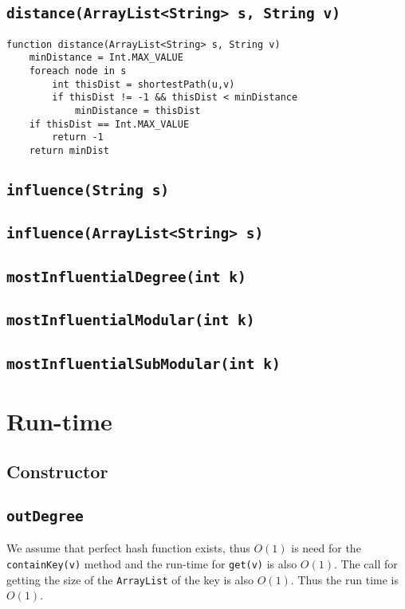 \documentclass[10pt,letterpaper]{article}
\begin{document}
\subsection{\texttt{distance(ArrayList<String> s, String v)}}
\begin{verbatim}
function distance(ArrayList<String> s, String v) 
    minDistance = Int.MAX_VALUE
    foreach node in s
        int thisDist = shortestPath(u,v)
        if thisDist != -1 && thisDist < minDistance
            minDistance = thisDist
    if thisDist == Int.MAX_VALUE
        return -1
    return minDist
\end{verbatim}
\subsection{\texttt{influence(String s)}}
\subsection{\texttt{influence(ArrayList<String> s)}}
\subsection{\texttt{mostInfluentialDegree(int k)}}
\subsection{\texttt{mostInfluentialModular(int k)}}
\subsection{\texttt{mostInfluentialSubModular(int k)}}
\section{Run-time}
\subsection{Constructor}
\subsection{\texttt{outDegree}}
We assume that perfect hash function exists, thus $O(1)$ is need for the \texttt{containKey(v)} method and the run-time for \texttt{get(v)} is also $O(1)$. The call for getting the size of the \texttt{ArrayList} of the key is also $O(1)$.
Thus the run time is $O(1)$.
\end{document}
